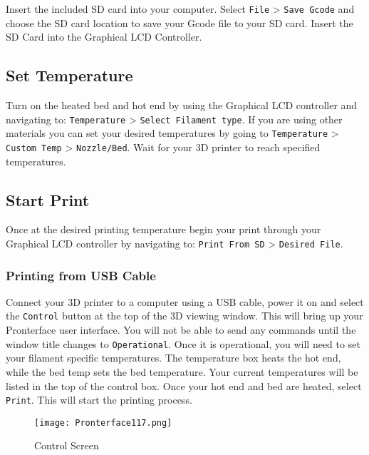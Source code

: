 Insert the included SD card into your computer. Select \texttt{File} > \texttt{Save Gcode} and choose the SD card location to save your Gcode file to your SD card. Insert the SD Card into the Graphical LCD Controller. 

\subsection{Set Temperature}

Turn on the heated bed and hot end by using the Graphical LCD controller and navigating to: \texttt{Temperature} > \texttt{Select Filament type}. If you are using other materials you can set your desired temperatures by going to \texttt{Temperature} > \texttt{Custom Temp} > \texttt{Nozzle/Bed}. Wait for your 3D printer to reach specified temperatures.

\subsection{Start Print}
Once at the desired printing temperature begin your print through your Graphical LCD controller by navigating to: \texttt{Print From SD} > \texttt{Desired File}.


\subsubsection{Printing from USB Cable}

Connect your 3D printer to a computer using a USB cable, power it on and select the \texttt{Control} button at the top of the 3D viewing window. This will bring up your Pronterface user interface. You will not be able to send any commands until the window title changes to \texttt{Operational}. Once it is operational, you will need to set your filament specific temperatures. The temperature box heats the hot end, while the bed temp sets the bed temperature. Your current temperatures will be listed in the top of the control box. Once your hot end and bed are heated, select \texttt{Print}. This will start the printing process.

\begin{figure}[H]
\centering
\texttt{[image: Pronterface117.png]}
\caption{Control Screen}
\label{fig:Control}
\end{figure}

